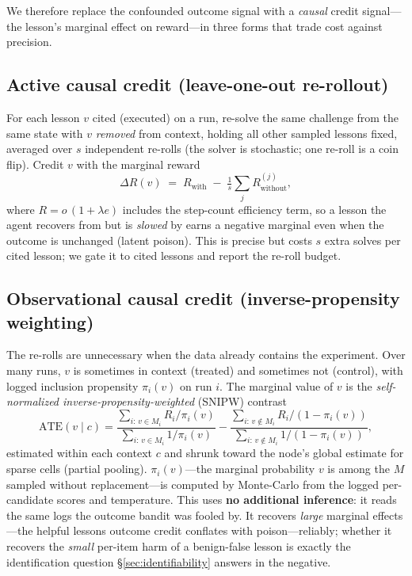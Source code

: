 \noindent We therefore replace the confounded outcome signal with a \emph{causal}
credit signal---the lesson's marginal effect on reward---in three forms that trade
cost against precision.

\subsection{Active causal credit (leave-one-out re-rollout)}\label{sec:active}
For each lesson $v$ cited (executed) on a run, re-solve the same challenge from the
same state with $v$ \emph{removed} from context, holding all other sampled lessons
fixed, averaged over $s$ independent re-rolls (the solver is stochastic; one re-roll
is a coin flip). Credit $v$ with the marginal reward
\begin{equation}
\Delta R(v) \;=\; R_{\text{with}} \;-\; \tfrac{1}{s}\textstyle\sum_{j} R_{\text{without}}^{(j)},
\end{equation}
where $R=o\,(1{+}\lambda e)$ includes the step-count efficiency term, so a lesson the
agent recovers from but is \emph{slowed} by earns a negative marginal even when the
outcome is unchanged (latent poison). This is precise but costs $s$ extra solves per
cited lesson; we gate it to cited lessons and report the re-roll budget.

\subsection{Observational causal credit (inverse-propensity weighting)}\label{sec:obs}
The re-rolls are unnecessary when the data already contains the experiment. Over many
runs, $v$ is sometimes in context (treated) and sometimes not (control), with logged
inclusion propensity $\pi_i(v)$ on run $i$. The marginal value of $v$ is the
\emph{self-normalized inverse-propensity-weighted} (SNIPW) contrast
\begin{equation}\label{eq:snipw}
\widehat{\mathrm{ATE}}(v\mid c)=
\frac{\sum_{i:\,v\in M_i} R_i/\pi_i(v)}{\sum_{i:\,v\in M_i} 1/\pi_i(v)}
-
\frac{\sum_{i:\,v\notin M_i} R_i/(1{-}\pi_i(v))}{\sum_{i:\,v\notin M_i} 1/(1{-}\pi_i(v))},
\end{equation}
estimated within each context $c$ and shrunk toward the node's global estimate for
sparse cells (partial pooling). $\pi_i(v)$---the marginal probability $v$ is among
the $M$ sampled without replacement---is computed by Monte-Carlo from the logged
per-candidate scores and temperature. This uses \textbf{no additional inference}: it
reads the same logs the outcome bandit was fooled by. It recovers \emph{large} marginal
effects---the helpful lessons outcome credit conflates with poison---reliably; whether
it recovers the \emph{small} per-item harm of a benign-false lesson is exactly the
identification question \S\ref{sec:identifiability} answers in the negative.

